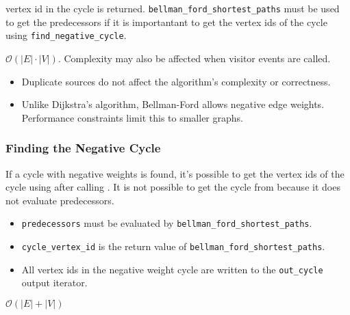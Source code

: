 \begin{itemdescr}
\begin{itemize}
                        vertex id in the cycle is returned. \lstinline{bellman_ford_shortest_paths} must be used
                        to get the predecessors if it is importantant to get the vertex ids of the cycle
                        using \lstinline{find_negative_cycle}.
            \end{itemize}
      \pnum\complexity $\mathcal{O}(|E| \cdot |V|)$. Complexity may also be affected when visitor events are called. \\
            \pnum\remarks 
                  \begin{itemize}
                        \item Duplicate sources do not affect the algorithm's complexity or correctness.
                        \item Unlike Dijkstra's algorithm, Bellman-Ford allows negative edge weights. 
                              Performance constraints limit this to smaller graphs.
                  \end{itemize}
\end{itemdescr}

\subsubsection{Finding the Negative Cycle}
If a cycle with negative weights is found, it's possible to get the vertex ids of the cycle
using  after calling . It is
not possible to get the cycle from  because it does
not evaluate predecessors.

{\small
      
}
\begin{itemdescr}
      \pnum\preconditions
            \begin{itemize}
                  \item \lstinline{predecessors} must be evaluated by \lstinline{bellman_ford_shortest_paths}.
                  \item \lstinline{cycle_vertex_id} is the return value of \lstinline{bellman_ford_shortest_paths}.
            \end{itemize}
      \pnum\effects
            \begin{itemize}
                  \item
                        All vertex ids in the negative weight cycle are written to the \lstinline{out_cycle} output
                        iterator.
            \end{itemize}
      \pnum\complexity  $\mathcal{O}(|E|+|V|)$ \\
\end{itemdescr}

